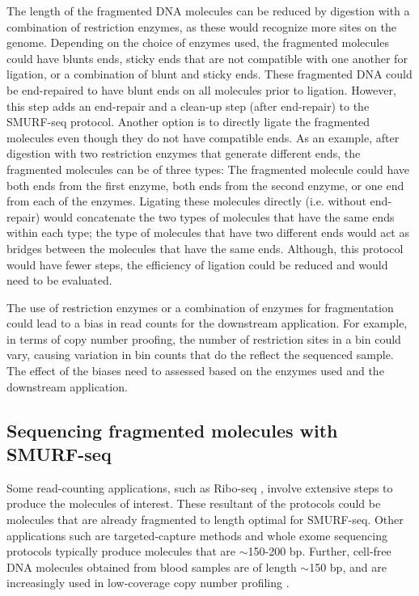 The length of the fragmented DNA molecules can be reduced by digestion
with a combination of restriction enzymes, as these would recognize more
sites on the genome. Depending on the choice of enzymes used, the
fragmented molecules could have blunts ends, sticky ends that are not
compatible with one another for ligation, or a combination of blunt and
sticky ends.
%
These fragmented DNA could be end-repaired to have blunt ends on all
molecules prior to ligation. However, this step adds an end-repair and a
clean-up step (after end-repair) to the SMURF-seq protocol.
%
Another option is to directly ligate the fragmented molecules even
though they do not have compatible ends. As an example, after digestion
with two restriction enzymes that generate different ends, the
fragmented molecules can be of three types: The fragmented molecule
could have both ends from the first enzyme, both ends from the second
enzyme, or one end from each of the enzymes. Ligating these molecules
directly (i.e. without end-repair) would concatenate the two types of
molecules that have the same ends within each type; the type of molecules
that have two different ends would act as bridges between the molecules
that have the same ends. Although, this protocol would have fewer steps,
the efficiency of ligation could be reduced and would need to be
evaluated.

The use of restriction enzymes or a combination of enzymes for
fragmentation could lead to a bias in read counts for the downstream
application. For example, in terms of copy number proofing, the number
of restriction sites in a bin could vary, causing variation in bin counts
that do the reflect the sequenced sample. The effect of the biases need
to assessed based on the enzymes used and the downstream application.



\subsection*{Sequencing fragmented molecules with SMURF-seq}
Some read-counting applications, such as Ribo-seq
\citep{ingolia2009genome}, involve extensive steps to produce the
molecules of interest. These resultant of the protocols could be
molecules that are already fragmented to length optimal for SMURF-seq.
Other applications such are targeted-capture methods and whole exome
sequencing protocols typically produce molecules that are $\sim$150-200
bp. Further, cell-free DNA molecules obtained from blood samples are of
length $\sim$150 bp, and are increasingly used in low-coverage copy
number profiling \citep{underhill2016fragment,adalsteinsson2017scalable}.

